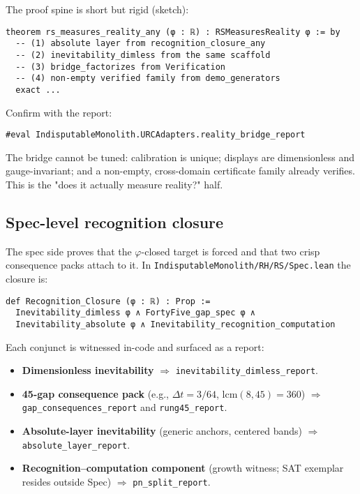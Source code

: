 \documentclass[11pt,a4paper,twoside]{article}
\numberwithin{equation}{section}
\renewcommand{\phi}{\varphi}
\theoremstyle{customthm}
\theoremstyle{customdef}
\theoremstyle{customrem}
\begin{document}
The proof spine is short but rigid (sketch):

\begin{lstlisting}
theorem rs_measures_reality_any (φ : ℝ) : RSMeasuresReality φ := by
  -- (1) absolute layer from recognition_closure_any
  -- (2) inevitability_dimless from the same scaffold
  -- (3) bridge_factorizes from Verification
  -- (4) non-empty verified family from demo_generators
  exact ...
\end{lstlisting}

Confirm with the report:

\begin{lstlisting}
#eval IndisputableMonolith.URCAdapters.reality_bridge_report
\end{lstlisting}

\begin{resultbox}[Meaning]
The bridge cannot be tuned: calibration is unique; displays are dimensionless and gauge-invariant; and a non-empty, cross-domain certificate family already verifies. This is the "does it actually measure reality?" half.
\end{resultbox}

\subsection{Spec-level recognition closure}

The spec side proves that the \(\phi\)-closed target is forced and that two crisp consequence packs attach to it. In \texttt{IndisputableMonolith/RH/RS/Spec.lean} the closure is:

\begin{lstlisting}
def Recognition_Closure (φ : ℝ) : Prop :=
  Inevitability_dimless φ ∧ FortyFive_gap_spec φ ∧
  Inevitability_absolute φ ∧ Inevitability_recognition_computation
\end{lstlisting}

Each conjunct is witnessed in-code and surfaced as a report:
\begin{itemize}[leftmargin=*]
  \item \textbf{Dimensionless inevitability} \(\Rightarrow\) \texttt{inevitability\_dimless\_report}.
  \item \textbf{45-gap consequence pack} (e.g., \(\Delta t = 3/64\), \(\mathrm{lcm}(8,45)=360\)) \(\Rightarrow\) \texttt{gap\_consequences\_report} and \texttt{rung45\_report}.
  \item \textbf{Absolute-layer inevitability} (generic anchors, centered bands) \(\Rightarrow\) \texttt{absolute\_layer\_report}.
  \item \textbf{Recognition–computation component} (growth witness; SAT exemplar resides outside Spec) \(\Rightarrow\) \texttt{pn\_split\_report}.
\end{itemize}
\end{document}
